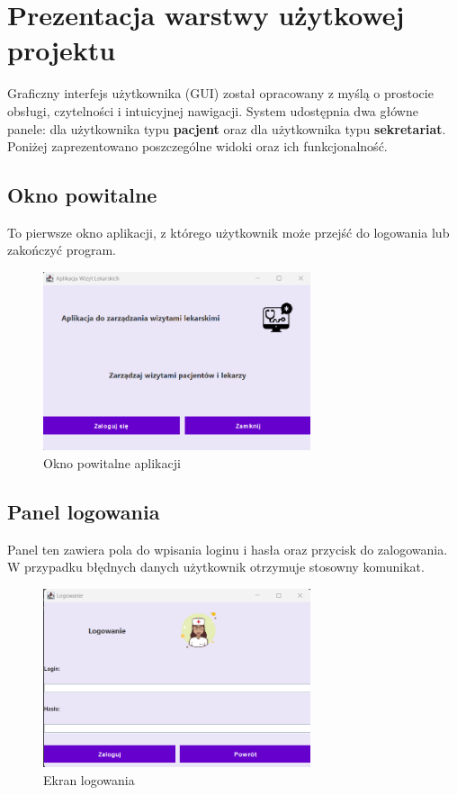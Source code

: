 \chapter{Prezentacja warstwy użytkowej projektu}

Graficzny interfejs użytkownika (GUI) został opracowany z myślą o prostocie obsługi, czytelności i intuicyjnej nawigacji. System udostępnia dwa główne panele: dla użytkownika typu \textbf{pacjent} oraz dla użytkownika typu \textbf{sekretariat}. Poniżej zaprezentowano poszczególne widoki oraz ich funkcjonalność.

\section{Okno powitalne}
To pierwsze okno aplikacji, z którego użytkownik może przejść do logowania lub zakończyć program.

\begin{figure}[H]
\centering
\includegraphics[width=0.7\textwidth]{figures/okno_powitalne.png}
\caption{Okno powitalne aplikacji}
\end{figure}

\section{Panel logowania}
Panel ten zawiera pola do wpisania loginu i hasła oraz przycisk do zalogowania. W przypadku błędnych danych użytkownik otrzymuje stosowny komunikat.

\begin{figure}[H]
\centering
\includegraphics[width=0.7\textwidth]{figures/okno_logowania.png}
\caption{Ekran logowania}
\end{figure}

